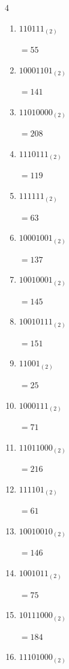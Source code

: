 \begin{multicols}{4}
\begin{enumerate}
        $=189$

  \item $110111_{(2)}$

        $=55$

  \item $10001101_{(2)}$

        $=141$

  \item $11010000_{(2)}$

        $=208$

  \item $1110111_{(2)}$

        $=119$

\columnbreak %

  \item $111111_{(2)}$

        $=63$

  \item $10001001_{(2)}$

        $=137$

  \item $10010001_{(2)}$

        $=145$

  \item $10010111_{(2)}$

        $=151$

  \item $11001_{(2)}$

        $=25$

  \item $1000111_{(2)}$

        $=71$

  \item $11011000_{(2)}$

        $=216$

  \item $111101_{(2)}$

        $=61$

  \item $10010010_{(2)}$

        $=146$

  \item $1001011_{(2)}$

        $=75$

  \item $10111000_{(2)}$

        $=184$

  \item $11101000_{(2)}$


\end{enumerate}
\end{multicols}

